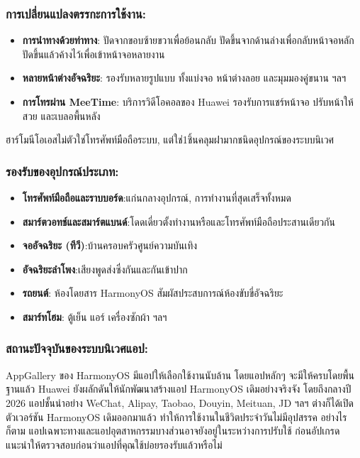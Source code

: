 \subsubsection*{การเปลี่ยนแปลงตรรกะการใช้งาน:}

\begin{itemize}
  \item \textbf{การนำทางด้วยท่าทาง}: ปัดจากขอบซ้ายขวาเพื่อย้อนกลับ ปัดขึ้นจากด้านล่างเพื่อกลับหน้าจอหลัก ปัดขึ้นแล้วค้างไว้เพื่อเข้าหน้าจอหลายงาน
  \item \textbf{หลายหน้าต่างอัจฉริยะ}: รองรับหลายรูปแบบ ทั้งแบ่งจอ หน้าต่างลอย และมุมมองคู่ขนาน ฯลฯ
  \item \textbf{การโทรผ่าน MeeTime}: บริการวิดีโอคอลของ Huawei รองรับการแชร์หน้าจอ ปรับหน้าให้สวย และเบลอพื้นหลัง
\end{itemize}


ฮาร์โมนีโอเอสไม่ตัวใช่โทรศัพท์มือถือระบบ, แต่ใช่1ชิ้นคลุมฝามากชนิดอุปกรณ์ของระบบนิเวศ

\subsubsection*{รองรับของอุปกรณ์ประเภท:}

\begin{itemize}
  \item \textbf{โทรศัพท์มือถือและราบบอร์ด}:แก่นกลางอุปกรณ์, การทำงานที่สุดเสร็จทั้งหมด
  \item \textbf{สมาร์ตวอทช์และสมาร์ตแบนด์}:โดดเดี่ยวตั้งทำงานหรือและโทรศัพท์มือถือประสานเดียวกัน
  \item \textbf{จออัจฉริยะ (ทีวี)}:บ้านครอบครัวศูนย์ความบันเทิง
  \item \textbf{อัจฉริยะลำโพง}:เสียงพูดส่งซึ่งกันและกันเข้าปาก
  \item \textbf{รถยนต์}: ห้องโดยสาร HarmonyOS สัมผัสประสบการณ์ห้องขับขี่อัจฉริยะ
  \item \textbf{สมาร์ทโฮม}: ตู้เย็น แอร์ เครื่องซักผ้า ฯลฯ
\end{itemize}

\subsubsection*{สถานะปัจจุบันของระบบนิเวศแอป:}

AppGallery ของ HarmonyOS มีแอปให้เลือกใช้งานนับล้าน โดยแอปหลักๆ จะมีให้ครบโดยพื้นฐานแล้ว Huawei ยังผลักดันให้นักพัฒนาสร้างแอป HarmonyOS เดิมอย่างจริงจัง โดยถึงกลางปี 2026 แอปชั้นนำอย่าง WeChat, Alipay, Taobao, Douyin, Meituan, JD ฯลฯ ต่างก็ได้เปิดตัวเวอร์ชัน HarmonyOS เดิมออกมาแล้ว ทำให้การใช้งานในชีวิตประจำวันไม่มีอุปสรรค อย่างไรก็ตาม แอปเฉพาะทางและแอปอุตสาหกรรมบางส่วนอาจยังอยู่ในระหว่างการปรับใช้ ก่อนอัปเกรดแนะนำให้ตรวจสอบก่อนว่าแอปที่คุณใช้บ่อยรองรับแล้วหรือไม่

